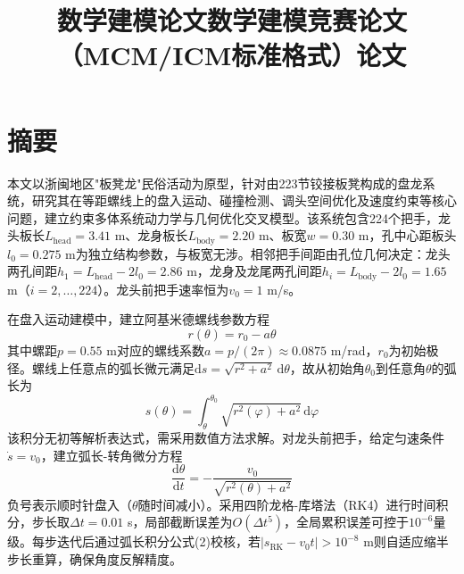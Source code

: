 \documentclass{mcmthesis}
\title{数学建模论文}
\begin{document}
\maketitle

\title{数学建模竞赛论文（MCM/ICM标准格式）论文}

\section{ 摘要}

本文以浙闽地区"板凳龙"民俗活动为原型，针对由223节铰接板凳构成的盘龙系统，研究其在等距螺线上的盘入运动、碰撞检测、调头空间优化及速度约束等核心问题，建立约束多体系统动力学与几何优化交叉模型。该系统包含224个把手，龙头板长$L_{\text{head}}=3.41$ m、龙身板长$L_{\text{body}}=2.20$ m、板宽$w=0.30$ m，孔中心距板头$l_0=0.275$ m为独立结构参数，与板宽无涉。相邻把手间距由孔位几何决定：龙头两孔间距$h_1=L_{\text{head}}-2l_0=2.86$ m，龙身及龙尾两孔间距$h_i=L_{\text{body}}-2l_0=1.65$ m（$i=2,\ldots,224$）。龙头前把手速率恒为$v_0=1$ m/s。

在盘入运动建模中，建立阿基米德螺线参数方程
\begin{equation}
r(\theta)=r_0-a\theta
\end{equation}
其中螺距$p=0.55$ m对应的螺线系数$a=p/(2\pi)\approx0.0875$ m/rad，$r_0$为初始极径。螺线上任意点的弧长微元满足$\mathrm{d}s=\sqrt{r^2+a^2}\,\mathrm{d}\theta$，故从初始角$\theta_0$到任意角$\theta$的弧长为
\begin{equation}
s(\theta)=\int_{\theta}^{\theta_0}\sqrt{r^2(\varphi)+a^2}\,\mathrm{d}\varphi
\end{equation}
该积分无初等解析表达式，需采用数值方法求解。对龙头前把手，给定匀速条件$\dot{s}=v_0$，建立弧长-转角微分方程
\begin{equation}
\frac{\mathrm{d}\theta}{\mathrm{d}t}=-\frac{v_0}{\sqrt{r^2(\theta)+a^2}}
\end{equation}
负号表示顺时针盘入（$\theta$随时间减小）。采用四阶龙格-库塔法（RK4）进行时间积分，步长取$\Delta t=0.01$ s，局部截断误差为$O(\Delta t^5)$，全局累积误差可控于$10^{-6}$量级。每步迭代后通过弧长积分公式(2)校核，若$|s_{\text{RK}}-v_0t|>10^{-8}$ m则自适应缩半步长重算，确保角度反解精度。
\end{document}
